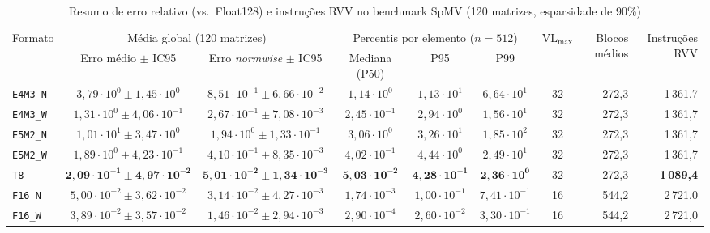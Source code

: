 \documentclass[journal]{IEEEtran}
\begin{document}
\begin{table}[!t]
\renewcommand{\arraystretch}{1.08}
\setlength{\tabcolsep}{3.5pt}
\caption{Resumo de erro relativo (vs.\ Float128) e instruções RVV no benchmark SpMV (120 matrizes, esparsidade de 90\%)}
\label{tab:spmv_summary}
\centering
\scriptsize
\begin{tabular}{l c c c c c c r r}
\hline
\multirow{2}{*}{Formato} & \multicolumn{2}{c}{Média global (120 matrizes)} & \multicolumn{3}{c}{Percentis por elemento ($n=512$)} & \multirow{2}{*}{$\mathrm{VL}_{\max}$} & \multirow{2}{*}{Blocos médios} & \multirow{2}{*}{Instruções RVV} \\
\cline{2-3} \cline{4-6}
 & Erro médio $\pm$ IC95 & Erro \emph{normwise} $\pm$ IC95 & Mediana (P50) & P95 & P99 & & & \\
\hline
\texttt{E4M3\_N} & $3{,}79\cdot 10^{0} \pm 1{,}45\cdot 10^{0}$   & $8{,}51\cdot 10^{-1} \pm 6{,}66\cdot 10^{-2}$ & $1{,}14\cdot 10^{0}$  & $1{,}13\cdot 10^{1}$  & $6{,}64\cdot 10^{1}$  & 32 &   272,3 & 1\,361,7 \\
\texttt{E4M3\_W} & $1{,}31\cdot 10^{0} \pm 4{,}06\cdot 10^{-1}$  & $2{,}67\cdot 10^{-1} \pm 7{,}08\cdot 10^{-3}$ & $2{,}45\cdot 10^{-1}$ & $2{,}94\cdot 10^{0}$  & $1{,}56\cdot 10^{1}$  & 32 &   272,3 & 1\,361,7 \\
\texttt{E5M2\_N} & $1{,}01\cdot 10^{1} \pm 3{,}47\cdot 10^{0}$   & $1{,}94\cdot 10^{0} \pm 1{,}33\cdot 10^{-1}$  & $3{,}06\cdot 10^{0}$  & $3{,}26\cdot 10^{1}$  & $1{,}85\cdot 10^{2}$  & 32 &   272,3 & 1\,361,7 \\
\texttt{E5M2\_W} & $1{,}89\cdot 10^{0} \pm 4{,}23\cdot 10^{-1}$  & $4{,}10\cdot 10^{-1} \pm 8{,}35\cdot 10^{-3}$ & $4{,}02\cdot 10^{-1}$ & $4{,}44\cdot 10^{0}$  & $2{,}49\cdot 10^{1}$  & 32 &   272,3 & 1\,361,7 \\
\texttt{T8}      & $\mathbf{2{,}09\cdot 10^{-1} \pm 4{,}97\cdot 10^{-2}}$ & $\mathbf{5{,}01\cdot 10^{-2} \pm 1{,}34\cdot 10^{-3}}$ & $\mathbf{5{,}03\cdot 10^{-2}}$ & $\mathbf{4{,}28\cdot 10^{-1}}$ & $\mathbf{2{,}36\cdot 10^{0}}$ & 32 & 272,3 & \textbf{1\,089,4} \\
\hline
\texttt{F16\_N}  & $5{,}00\cdot 10^{-2} \pm 3{,}62\cdot 10^{-2}$ & $3{,}14\cdot 10^{-2} \pm 4{,}27\cdot 10^{-3}$ & $1{,}74\cdot 10^{-3}$ & $1{,}00\cdot 10^{-1}$ & $7{,}41\cdot 10^{-1}$ & 16 &   544,2 & 2\,721,0 \\
\texttt{F16\_W}  & $3{,}89\cdot 10^{-2} \pm 3{,}57\cdot 10^{-2}$ & $1{,}46\cdot 10^{-2} \pm 2{,}94\cdot 10^{-3}$ & $2{,}90\cdot 10^{-4}$ & $2{,}60\cdot 10^{-2}$ & $3{,}30\cdot 10^{-1}$ & 16 &   544,2 & 2\,721,0 \\

\end{tabular}
\end{table}
\end{document}
